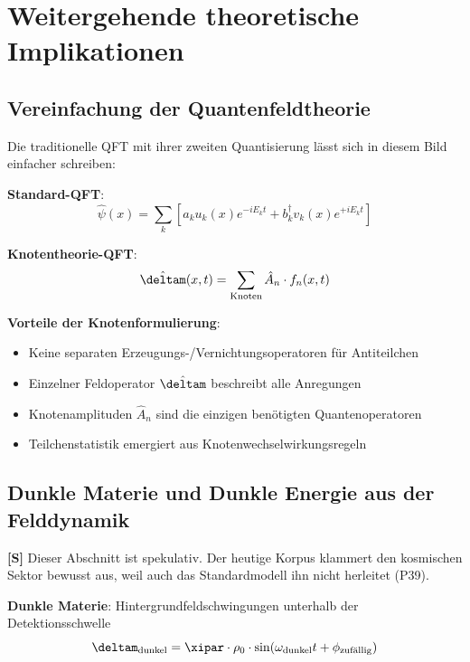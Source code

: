 	\section{Weitergehende theoretische Implikationen}
	
	\subsection{Vereinfachung der Quantenfeldtheorie}
	
	Die traditionelle QFT mit ihrer zweiten Quantisierung lässt sich in diesem Bild einfacher schreiben:
	
	\textbf{Standard-QFT}:
	\begin{equation}
		\hat{\psi}(x) = \sum_k \left[ a_k u_k(x) e^{-iE_k t} + b_k^\dagger v_k(x) e^{+iE_k t} \right]
	\end{equation}
	
	\textbf{Knotentheorie-QFT}:
	\begin{equation}
		\hat{\deltam}(x,t) = \sum_{\text{Knoten}} \hat{A}_n \cdot f_n(x,t)
	\end{equation}
	
	\textbf{Vorteile der Knotenformulierung}:
	\begin{itemize}
		\item Keine separaten Erzeugungs-/Vernichtungsoperatoren für Antiteilchen
		\item Einzelner Feldoperator $\hat{\deltam}$ beschreibt alle Anregungen
		\item Knotenamplituden $\hat{A}_n$ sind die einzigen benötigten Quantenoperatoren
		\item Teilchenstatistik emergiert aus Knotenwechselwirkungsregeln
	\end{itemize}
	
	\subsection{Dunkle Materie und Dunkle Energie aus der Felddynamik}
	
	\textbf{[S]} Dieser Abschnitt ist spekulativ. Der heutige Korpus klammert den kosmischen Sektor bewusst aus, weil auch das Standardmodell ihn nicht herleitet (P39).
	
	\textbf{Dunkle Materie}: Hintergrundfeldschwingungen unterhalb der Detektionsschwelle
	\begin{equation}
		\deltam_{\text{dunkel}} = \xipar \cdot \rho_0 \cdot \sin(\omega_{\text{dunkel}} t + \phi_{\text{zufällig}})
	\end{equation}
	
